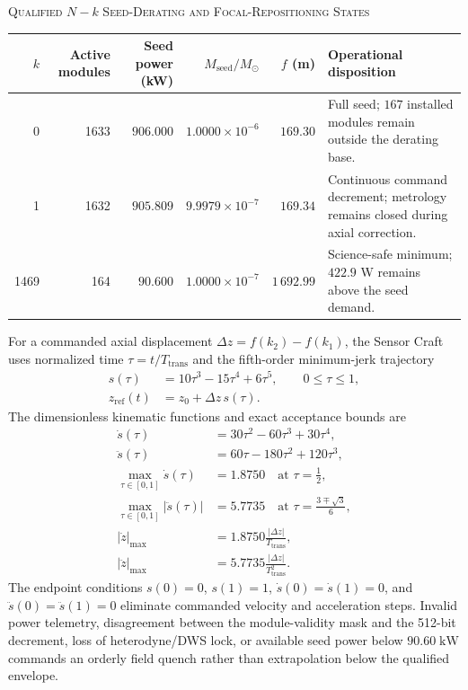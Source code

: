 \documentclass[10pt,twocolumn]{IEEEtran}
\newcommand{\Msun}{M_{\odot}}
\begin{document}
\begin{table}[t]
\centering
\footnotesize
\textsc{Qualified $N-k$ Seed-Derating and Focal-Repositioning States}\par\smallskip
\begin{tabular}{@{}rrrrrp{5.0cm}@{}}
\toprule
$k$ & Active modules & Seed power (kW) & $M_{\mathrm{seed}}/\Msun$ & $f$ (m) & Operational disposition \\
\midrule
0 & 1633 & $906.000$ & $1.0000\times10^{-6}$ & $169.30$ & Full seed; $167$ installed modules remain outside the derating base. \\
1 & 1632 & $905.809$ & $9.9979\times10^{-7}$ & $169.34$ & Continuous command decrement; metrology remains closed during axial correction. \\
1469 & 164 & $90.600$ & $1.0000\times10^{-7}$ & $1\,692.99$ & Science-safe minimum; $422.9$ W remains above the seed demand. \\
\bottomrule
\end{tabular}
\end{table}

For a commanded axial displacement $\Delta z=f(k_2)-f(k_1)$, the Sensor
Craft uses normalized time $\tau=t/T_{\mathrm{trans}}$ and the fifth-order
minimum-jerk trajectory
\begin{equation}
\begin{aligned}
s(\tau)&=10\tau^3-15\tau^4+6\tau^5,
\qquad 0\leq\tau\leq1, \\
z_{\mathrm{ref}}(t)&=z_0+\Delta z\,s(\tau).
\end{aligned}
\label{eq:minimum_jerk_reposition}
\end{equation}
The dimensionless kinematic functions and exact acceptance bounds are
\begin{equation}
\begin{aligned}
\dot{s}(\tau)&=30\tau^2-60\tau^3+30\tau^4, \\
\ddot{s}(\tau)&=60\tau-180\tau^2+120\tau^3, \\
\max_{\tau\in[0,1]}\dot{s}(\tau)&=1.8750
\quad\text{at }\tau=\frac{1}{2}, \\
\max_{\tau\in[0,1]}|\ddot{s}(\tau)|&=5.7735
\quad\text{at }\tau=\frac{3\mp\sqrt{3}}{6}, \\
|\dot z|_{\max}&=1.8750\frac{|\Delta z|}{T_{\mathrm{trans}}}, \\
|\ddot z|_{\max}&=5.7735\frac{|\Delta z|}{T_{\mathrm{trans}}^2}.
\end{aligned}
\label{eq:minimum_jerk_limits}
\end{equation}
The endpoint conditions $s(0)=0$, $s(1)=1$,
$\dot{s}(0)=\dot{s}(1)=0$, and
$\ddot{s}(0)=\ddot{s}(1)=0$ eliminate commanded velocity and acceleration
steps.  Invalid power telemetry, disagreement between the module-validity
mask and the 512-bit decrement, loss of heterodyne/DWS lock, or available seed
power below $90.60\;\mathrm{kW}$ commands an orderly field quench rather than
extrapolation below the qualified envelope.
\end{document}
